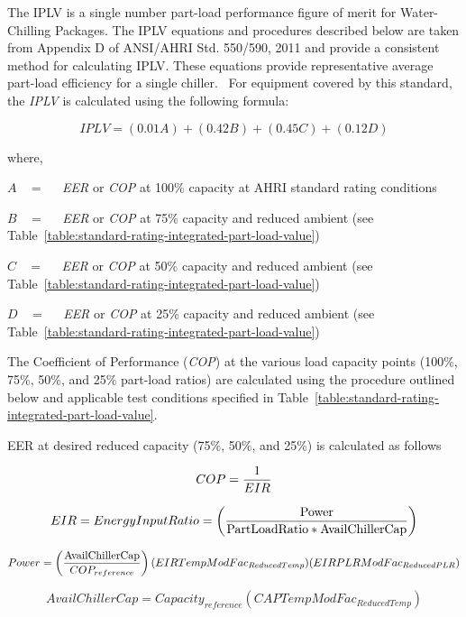 The IPLV is a single number part-load performance figure of merit for Water-Chilling Packages. The IPLV equations and procedures described below are taken from Appendix D of ANSI/AHRI Std. 550/590, 2011 and provide a consistent method for calculating IPLV. These equations provide representative average part-load efficiency for a single chiller. ~For equipment covered by this standard, the \emph{IPLV} is calculated using the following formula:

\begin{equation}
IPLV = (0.01A) + (0.42B) + (0.45C) + (0.12D)
\end{equation}

where,

\(A\) ~ = ~~ \emph{EER} or \emph{COP} at 100\% capacity at AHRI standard rating conditions

\(B\) ~ = ~~ \emph{EER} or \emph{COP} at 75\% capacity and reduced ambient (see Table~\ref{table:standard-rating-integrated-part-load-value})

\(C\) ~ = ~~ \emph{EER} or \emph{COP} at 50\% capacity and reduced ambient (see Table~\ref{table:standard-rating-integrated-part-load-value})

\(D\) ~ = ~~ \emph{EER} or \emph{COP} at 25\% capacity and reduced ambient (see Table~\ref{table:standard-rating-integrated-part-load-value})

The Coefficient of Performance (\emph{COP}) at the various load capacity points (100\%, 75\%, 50\%, and 25\% part-load ratios) are calculated using the procedure outlined below and applicable test conditions specified in Table~\ref{table:standard-rating-integrated-part-load-value}.

EER at desired reduced capacity (75\%, 50\%, and 25\%) is calculated as follows

\begin{equation}
COP = \frac{{\rm{1}}}{{EIR}}
\end{equation}

\begin{equation}
EIR = EnergyInputRatio = \left( {\frac{{{\rm{Power }}}}{{{\rm{PartLoadRatio * AvailChillerCap}}}}} \right)
\end{equation}

\begin{equation}
Power = \left( {\frac{{{\rm{AvailChillerCap}}}}{{CO{P_{reference}}}}} \right)(EIRTempModFa{c_{ReducedTemp}})(EIRPLRModFa{c_{ReducedPLR}})
\end{equation}

\begin{equation}
AvailChillerCap = Capacit{y_{reference}}(CAPTempModFa{c_{ReducedTemp}})
\end{equation}

